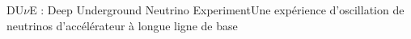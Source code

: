 \begin{frame}{DU$\nu$E : Deep Underground Neutrino Experiment}{Une expérience d'oscillation de neutrinos d'accélérateur à longue ligne de base}
\begin{scriptsize}
        \end{scriptsize}
    \end{frame}
    
